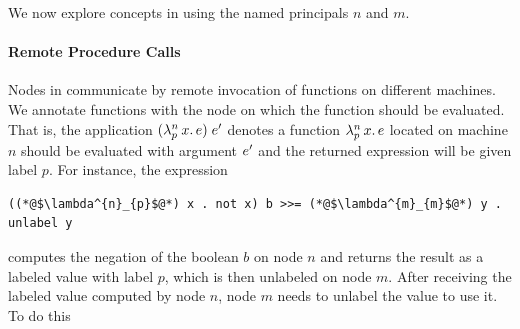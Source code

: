 We now explore concepts in \lang{} using the named principals $n$ and $m$.

\paragraph{Remote Procedure Calls}
Nodes in \lang{} communicate by remote invocation of functions on different machines. We annotate functions with the node on which the function should be evaluated. That is, the application $(\lambda^{n}_{p}\,x.\,e)\;e'$ denotes a function $\lambda^{n}_{p}\,x.\,e$ located on machine $n$ should be evaluated with argument $e'$ and the returned expression will be given label $p$. For instance, the expression
\begin{lstlisting}
((*@$\lambda^{n}_{p}$@*) x . not x) b >>= (*@$\lambda^{m}_{m}$@*) y . unlabel y
\end{lstlisting}
computes the negation of the boolean $b$ on node $n$ and returns the result as a labeled value with label $p$, which is then unlabeled on node $m$. After receiving the labeled value computed by node $n$, node $m$ needs to unlabel the value to use it. To do this 

